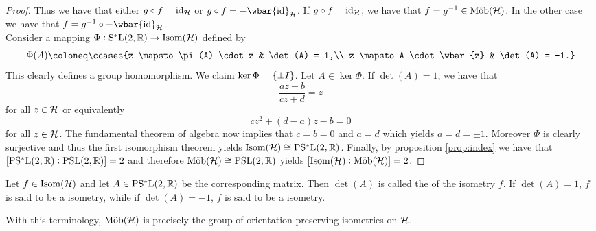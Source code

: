 \begin{proof}
	Thus we have that either $g \circ f = \operatorname{id}_{\mathcal{H}}$ or $g \circ f = -\wbar{\id}_\Hcal$. If $g \circ f = \operatorname{id}_{\mathcal{H}}$, we have that $f = g^{-1} \in \mathrm{M\ddot{o}b}(\mathcal{H})$. In the other case we have that $f = g^{-1} \circ -\wbar{\id}_\Hcal$.\\
	Consider a mapping $\Phi : \mathrm{S^*L}(2,\mathbb{R}) \to \mathrm{Isom}(\mathcal{H})$ defined by 
	\begin{equation*}
		\Phi(A) \coloneq \ccases{z \mapsto \pi(A) \cdot z & \det(A) = 1,\\
			z \mapsto A \cdot \wbar{z} & \det(A) = -1.}
	\end{equation*}
	This clearly defines a group homomorphism. We claim $\ker \Phi = \cbr[0]{\pm I}$. Let $A \in \ker \Phi$. If $\det(A) = 1$, we have that 
	\begin{equation*}
		\frac{az + b}{cz + d} = z
	\end{equation*}
	\noindent for all $z \in \mathcal{H}$ or equivalently
	\begin{equation*}
		cz^2 + (d - a)z - b = 0
	\end{equation*}
	\noindent for all $z \in \mathcal{H}$. The fundamental theorem of algebra now implies that $c = b = 0$ and $a = d$ which yields $a = d = \pm 1$. Moreover $\Phi$ is 
	clearly surjective and thus the first isomorphism theorem \cite[23]{grillet:abstract_algebra:2007} yields $\mathrm{Isom}(\mathcal{H}) \cong \mathrm{PS^*L}(2,\mathbb{R})$. Finally, by proposition \ref{prop:index} we have that $\sbr[0]{\PSLrmstar(2,\Rbb) : \PSLrm(2,\Rbb)} = 2$ and therefore $\mathrm{M\ddot{o}b}(\mathcal{H}) \cong \mathrm{PSL}(2,\mathbb{R})$ yields $\sbr[0]{\Isom(\Hcal) : \Mob(\Hcal)} = 2$.
\end{proof}

\begin{definition}
	Let $f \in \mathrm{Isom}(\mathcal{H})$ and let $A \in \mathrm{PS^*L}(2,\mathbb{R})$ be the corresponding matrix. Then $\det(A)$ is called the  of the isometry $f$. If $\det(A) = 1$, $f$ is said to be a  isometry, while if $\det(A) = -1$, $f$ is said to be a  isometry.
\end{definition}

\begin{remark}
	With this terminology, $\mathrm{M\ddot{o}b}(\mathcal{H})$ is precisely the group of orientation-preserving isometries on $\mathcal{H}$.
\end{remark}

\printbibliography


